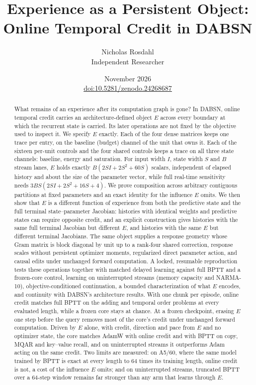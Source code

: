 \documentclass[11pt]{article}
\title{Experience as a Persistent Object:\\Online Temporal Credit in DABSN}
\author{Nicholas Rosdahl\\Independent Researcher}
\date{November 2026\\[0.5em]\small\href{https://doi.org/10.5281/zenodo.24268687}{doi:10.5281/zenodo.24268687}}
\theoremstyle{definition}
\begin{document}
\maketitle

\begin{abstract}
What remains of an experience after its computation graph is gone? In DABSN,
online temporal credit carries an architecture-defined object $E$ across every
boundary at which the recurrent state is carried. Its later operations are not
fixed by the objective used to inspect it. We specify $E$ exactly. Each of the
four dense matrices keeps one trace per entry, on the baseline (budget) channel
of the unit that owns it. Each of the sixteen per-unit controls and the four
shared controls keeps a trace on all three state channels: baseline, energy and
saturation. For input width $I$, state width $S$ and $B$ stream lanes, $E$ holds
exactly $B(2SI+2S^2+60S)$ scalars, independent of elapsed history and about the
size of the parameter vector, while full real-time sensitivity needs
$3BS(2SI+2S^2+16S+4)$. We prove composition across arbitrary contiguous
partitions at fixed parameters and an exact identity for the influence $E$
omits. We then show that $E$ is a different function of experience from both
the predictive state and the full terminal state--parameter Jacobian: histories
with identical weights and predictive states can require opposite credit, and an
explicit construction gives histories with the same full terminal Jacobian but
different $E$, and histories with the same $E$ but different terminal Jacobians.
The same object supplies a response geometry whose Gram matrix is block diagonal
by unit up to a rank-four shared correction, response scales without persistent
optimizer moments, regularized direct parameter action, and causal edits under
unchanged forward computation. A locked, resumable reproduction tests these
operations together with matched delayed learning against full BPTT and a
frozen-core control, learning on uninterrupted streams (memory capacity and NARMA-10), objective-conditioned
continuation, a bounded characterization of what $E$ encodes, and continuity with
DABSN's architecture results. With one chunk per episode, online credit matches
full BPTT on the adding and temporal order problems at every evaluated length,
while a frozen core stays at chance. At a frozen checkpoint, erasing $E$ one step
before the query removes most of the core's credit under unchanged forward
computation. Driven by $E$ alone, with credit, direction and pace from $E$ and no
optimizer state, the core matches AdamW with online credit and with BPTT on copy,
MQAR and key--value recall, and on uninterrupted streams it outperforms Adam acting
on the same credit. Two limits are measured: on A5/60, where the same model trained
by BPTT is exact at every length to 64 times its training length, online credit is
not, a cost of the influence $E$ omits; and on uninterrupted streams, truncated BPTT
over a 64-step window remains far stronger than any arm that learns through $E$.
\end{abstract}
\end{document}
